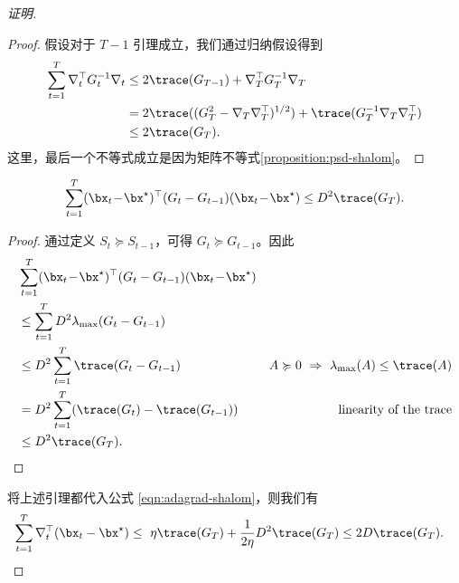 \begin{proof}[证明]
\begin{proof}
假设对于 $T - 1$ 引理成立，我们通过归纳假设得到
\begin{align*}
\sum_{t=1}^T \nabla_t^\top  G_t^{-1} \nabla_t & \le 2 \trace(G_{T-1} )  + \nabla_T^\top  G_T^{-1} \nabla_T \\
& = 2 \trace(   ({G_{T}^2 - \nabla_T \nabla_T^\top})^{1/2}  )  + \trace( G_T^{-1}  \nabla_T \nabla_T^\top) \\
& \leq 2 \trace( G_{T} ).  
\end{align*}
这里，最后一个不等式成立是因为矩阵不等式\ref{proposition:psd-shalom}。
\end{proof}

\begin{lemma}
\label{lemma:opt-reg-bound2-adagrad}
\begin{equation*}
\sum_{t=1}^{T} (\bx_t\! -\! \bx^\star)^\top (G_t - G_{t-1} ) (\bx_t\! -\! \bx^\star) \leq D^2 \trace(G_T). 
\end{equation*}
\end{lemma}
\begin{proof}
通过定义 $S_t \succcurlyeq S_{t-1}$，可得 $G_t \succcurlyeq G_{t-1}$。因此
\begin{align*}
& \sum_{t=1}^{T} (\bx_t\! -\! \bx^\star)^\top (G_t - G_{t-1} ) (\bx_t\! -\! \bx^\star) \\
& \leq \sum_{t=1}^{T} D^2  \lambda_{\max}( G_t - G_{t-1} ) \\
& \leq D^2 \sum_{t=1}^{T}  \trace (G_t - G_{t-1})  & A \succcurlyeq 0 \ \Rightarrow \  \lambda_{\max}(A) \leq \trace(A) \\
& = D^2 \sum_{t=1}^{T}  (\trace (G_t ) - \trace( G_{t-1}))  &  \mbox{ linearity of the trace} \\
& \leq D^2 \trace(G_T). 
\end{align*}
\end{proof}

将上述引理都代入公式   \eqref{eqn:adagrad-shalom}，则我们有
\begin{align*}
&\sum_{t=1}^T \nabla_t^\top (\bx_t - \bx^\star)  \leq \ {\eta} \trace(G_T) + \frac{1}{2\eta} D^2 \trace(G_T)   \leq 2 D \trace(G_T).  
\end{align*} 
\end{proof}


